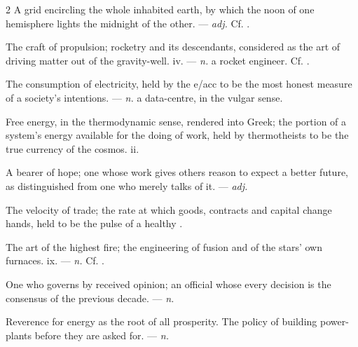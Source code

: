 \begin{multicols}{2}
 A grid encircling the whole inhabited earth, by which the noon of one hemisphere lights the midnight of the other. —  \textit{adj.} Cf. .

 The craft of propulsion; rocketry and its descendants, considered as the art of driving matter out of the gravity-well.   iv. —  \textit{n.} a rocket engineer. Cf. .

 The consumption of electricity, held by the e/acc to be the most honest measure of a society's intentions. —  \textit{n.} a data-centre, in the vulgar sense.

 Free energy, in the thermodynamic sense, rendered into Greek; the portion of a system's energy available for the doing of work, held by thermotheists to be the true currency of the cosmos.   ii.

 A bearer of hope; one whose work gives others reason to expect a better future, as distinguished from one who merely talks of it. —  \textit{adj.}

 The velocity of trade; the rate at which goods, contracts and capital change hands, held to be the pulse of a healthy .

 The art of the highest fire; the engineering of fusion and of the stars' own furnaces.   ix. —  \textit{n.} Cf. .

 One who governs by received opinion; an official whose every decision is the consensus of the previous decade. —  \textit{n.}

  Reverence for energy as the root of all prosperity.  The policy of building power-plants before they are asked for. —  \textit{n.}


\end{multicols}
